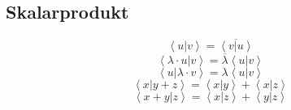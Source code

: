 \documentclass{article}
\begin{document}
\subsection{Skalarprodukt}
\[ \left<u|v\right> = \overline{\left<v|u\right>} \]
\[ \left<\lambda\cdot u|v\right> = \overline{\lambda}\left<u|v\right> \]
\[ \left<u|\lambda\cdot v\right> = \lambda\left<u|v\right> \]
\[ \left<x|y+z\right> = \left<x|y\right> + \left<x|z\right> \]
\[ \left<x+y|z\right> = \left<x|z\right> + \left<y|z\right> \]
\end{document}
